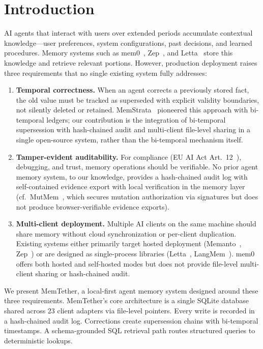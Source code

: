 \documentclass{article}
\begin{document}
\section{Introduction}
\label{sec:intro}

AI agents that interact with users over extended periods accumulate contextual knowledge---user preferences, system configurations, past decisions, and learned procedures. Memory systems such as mem0~\citep{mem0}, Zep~\citep{zep}, and Letta~\citep{letta} store this knowledge and retrieve relevant portions. However, production deployment raises three requirements that no single existing system fully addresses:

\begin{enumerate}
\item \textbf{Temporal correctness.} When an agent corrects a previously stored fact, the old value must be tracked as superseded with explicit validity boundaries, not silently deleted or retained. MemStrata~\citep{memstrata} pioneered this approach with bi-temporal ledgers; our contribution is the integration of bi-temporal supersession with hash-chained audit and multi-client file-level sharing in a single open-source system, rather than the bi-temporal mechanism itself.
\item \textbf{Tamper-evident auditability.} For compliance (EU AI Act Art.~12~\citep{euaiact}), debugging, and trust, memory operations should be verifiable. No prior agent memory system, to our knowledge, provides a hash-chained audit log with self-contained evidence export with local verification in the memory layer (cf.~MutMem~\citep{mutmem}, which secures mutation authorization via signatures but does not produce browser-verifiable evidence exports).
\item \textbf{Multi-client deployment.} Multiple AI clients on the same machine should share memory without cloud synchronization or per-client duplication. Existing systems either primarily target hosted deployment (Memanto~\citep{memanto}, Zep~\citep{zep}) or are designed as single-process libraries (Letta~\citep{letta}, LangMem~\citep{langmem}). mem0~\citep{mem0} offers both hosted and self-hosted modes but does not provide file-level multi-client sharing or hash-chained audit.
\end{enumerate}

We present MemTether, a local-first agent memory system designed around these three requirements. MemTether's core architecture is a single SQLite database shared across 23 client adapters via file-level pointers. Every write is recorded in a hash-chained audit log. Corrections create supersession chains with bi-temporal timestamps. A schema-grounded SQL retrieval path routes structured queries to deterministic lookups.
\end{document}
